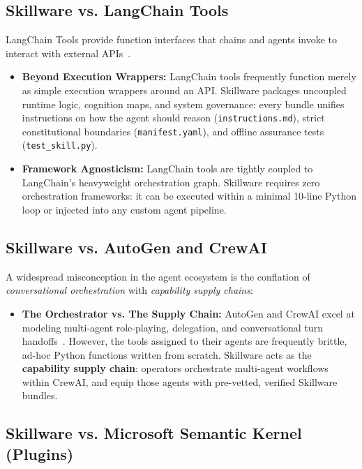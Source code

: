 \subsection{Skillware vs. LangChain Tools}
\label{subsec:comp_langchain}

LangChain Tools provide function interfaces that chains and agents invoke to interact with external APIs~\cite{chase2022langchain}.
\begin{itemize}[leftmargin=*]
  \item \textbf{Beyond Execution Wrappers:} LangChain tools frequently function merely as simple execution wrappers around an API. Skillware packages uncoupled runtime logic, cognition maps, and system governance: every bundle unifies instructions on how the agent should reason (\texttt{instructions.md}), strict constitutional boundaries (\texttt{manifest.yaml}), and offline assurance tests (\texttt{test\_skill.py}).
  \item \textbf{Framework Agnosticism:} LangChain tools are tightly coupled to LangChain's heavyweight orchestration graph. Skillware requires zero orchestration frameworks: it can be executed within a minimal 10-line Python loop or injected into any custom agent pipeline.
\end{itemize}

\subsection{Skillware vs. AutoGen and CrewAI}
\label{subsec:comp_autogen_crewai}

A widespread misconception in the agent ecosystem is the conflation of \emph{conversational orchestration} with \emph{capability supply chains}:
\begin{itemize}[leftmargin=*]
  \item \textbf{The Orchestrator vs. The Supply Chain:} AutoGen and CrewAI excel at modeling multi-agent role-playing, delegation, and conversational turn handoffs~\cite{wu2023autogen, mourato2023crewai}. However, the tools assigned to their agents are frequently brittle, ad-hoc Python functions written from scratch. Skillware acts as the \textbf{capability supply chain}: operators orchestrate multi-agent workflows within CrewAI, and equip those agents with pre-vetted, verified Skillware bundles.
\end{itemize}

\subsection{Skillware vs. Microsoft Semantic Kernel (Plugins)}
\label{subsec:comp_semantic_kernel}

